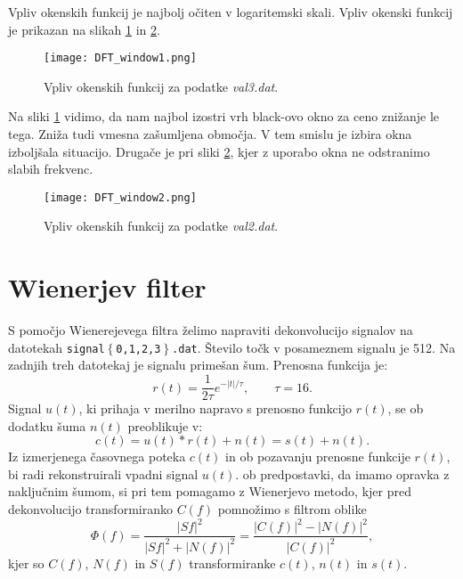 \documentclass[12pt,a4paper]{article}
\begin{document}
\noindent Vpliv okenskih funkcij je najbolj očiten v logaritemski skali. Vpliv okenski funkcij je prikazan na slikah \ref{fig:slika6} in \ref{fig:slika7}.

\begin{figure}[H]
    \centering
        \texttt{[image: DFT\_window1.png]}
    \caption{Vpliv okenskih funkcij za podatke \textit{val3.dat}.} \label{fig:slika6}
\end{figure}

\noindent Na sliki \ref{fig:slika6} vidimo, da nam najbol izostri vrh black-ovo okno za ceno znižanje le tega. Zniža tudi vmesna zašumljena območja. V tem smislu je izbira okna izboljšala situacijo.
Drugače je pri sliki \ref{fig:slika7}, kjer z uporabo okna ne odstranimo slabih frekvenc.

\begin{figure}[H]
    \centering
        \texttt{[image: DFT\_window2.png]}
    \caption{Vpliv okenskih funkcij za podatke \textit{val2.dat}.} \label{fig:slika7}
\end{figure}


\section*{Wienerjev filter}

S pomočjo Wienerejevega filtra želimo napraviti dekonvolucijo signalov na datotekah \texttt{signal$\left\lbrace \right.$0,1,2,3$ \left. \right\rbrace$.dat}. Število točk v posameznem signalu je 512. Na zadnjih treh datotekaj je signalu primešan šum. Prenosna funkcija je:
\begin{equation}
r(t)=\frac{1}{2\tau}e^{-|t|/\tau}, \qquad \tau=16.
\end{equation}
Signal $u(t)$, ki prihaja v merilno napravo s prenosno funkcijo $r(t)$, se ob dodatku šuma $n(t)$ preoblikuje v:
\begin{equation}
c(t)=u(t) * r(t) + n(t)=s(t) + n(t).
\end{equation}
Iz izmerjenega časovnega poteka $c(t)$ in ob pozavanju prenosne funkcije $r(t)$, bi radi rekonstruirali vpadni signal $u(t)$. ob predpostavki, da imamo opravka z naključnim šumom, si pri tem pomagamo z Wienerjevo metodo, kjer pred dekonvolucijo transformiranko $C(f)$ pomnožimo s filtrom oblike
\begin{equation} \label{eq:wiener_factor}
\Phi (f) = \frac{|S{f}|^{2}}{|S{f}|^{2} + |N(f)|^{2}}= \frac{|C(f)|^{2} - |N(f)|^{2}}{|C(f)|^{2}},
\end{equation}
kjer so $C(f)$, $N(f)$ in $S(f)$ transformiranke $c(t)$, $n(t)$ in $s(t)$.
\end{document}

